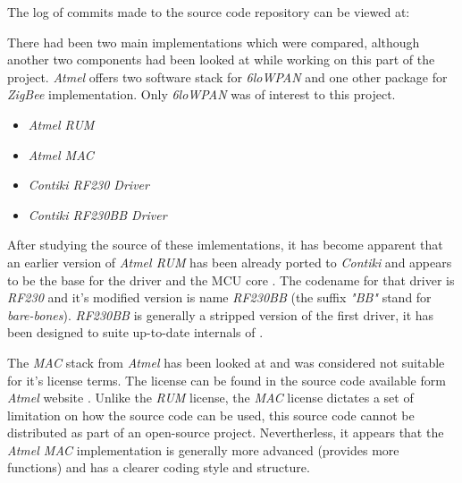   The log of commits made to the source code repository can be viewed at:

\footnotesize
{}
\normalsize

  There had been two main implementations which were compared, although
 another two components had been looked at while working on this part
 of the project. \emph{Atmel} offers two software stack for \emph{6loWPAN}
 and one other package for \emph{ZigBee} implementation. Only \emph{6loWPAN}
 was of interest to this project.

\begin{itemize}

	\item\emph{Atmel RUM} \cite{links:atmel:rum}
	\item\emph{Atmel MAC} \cite{links:atmel:mac}
	\item\emph{Contiki RF230 Driver}
	\item\emph{Contiki RF230BB Driver}

\end{itemize}

  After studying the source of these imlementations, it has become apparent
 that an earlier version of \emph{Atmel RUM} has been already ported to
 \emph{Contiki} and appears to be the base for the  driver
 and the MCU core . The codename for that driver is
 \emph{RF230} and it's modified version is name \emph{RF230BB} (the
 suffix \emph{"BB"} stand for \emph{bare-bones}). \emph{RF230BB} is
 generally a stripped version of the first driver, it has been designed
 to suite up-to-date internals of \ContikiOS.

  The \emph{MAC} stack from \emph{Atmel} has been looked at and was
 considered  not suitable for it's license terms. The license can be
 found in the source code available form \emph{Atmel} website
 \cite{links:atmel:mac}. Unlike the \emph{RUM} license, the \emph{MAC}
 license dictates a set of limitation on how the source code can be used, 
 this source code cannot be distributed as part of an open-source project.
 Nevertherless, it appears that the \emph{Atmel MAC} implementation is
 generally more advanced (provides more functions) and has a clearer
 coding style and structure.
 
